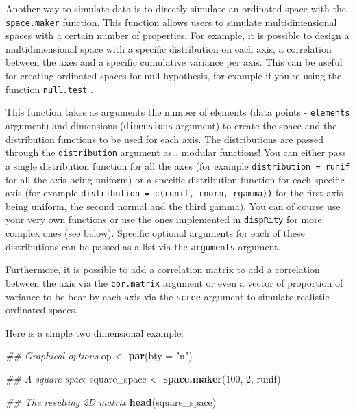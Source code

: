 \documentclass[
]{book}
\newenvironment{Shaded}{\begin{snugshade}}{\end{snugshade}}
\newcommand{\CommentTok}[1]{\textcolor[rgb]{0.56,0.35,0.01}{\textit{#1}}}
\newcommand{\DataTypeTok}[1]{\textcolor[rgb]{0.13,0.29,0.53}{#1}}
\newcommand{\DecValTok}[1]{\textcolor[rgb]{0.00,0.00,0.81}{#1}}
\newcommand{\KeywordTok}[1]{\textcolor[rgb]{0.13,0.29,0.53}{\textbf{#1}}}
\newcommand{\NormalTok}[1]{#1}
\newcommand{\StringTok}[1]{\textcolor[rgb]{0.31,0.60,0.02}{#1}}
\begin{document}
Another way to simulate data is to directly simulate an ordinated space with the \texttt{space.maker} function.
This function allows users to simulate multidimensional spaces with a certain number of properties.
For example, it is possible to design a multidimensional space with a specific distribution on each axis, a correlation between the axes and a specific cumulative variance per axis.
This can be useful for creating ordinated spaces for null hypothesis, for example if you're using the function \texttt{null.test} \citep{diaz2016global}.

This function takes as arguments the number of elements (data points - \texttt{elements} argument) and dimensions (\texttt{dimensions} argument) to create the space and the distribution functions to be used for each axis.
The distributions are passed through the \texttt{distribution} argument as\ldots{} modular functions!
You can either pass a single distribution function for all the axes (for example \texttt{distribution\ =\ runif} for all the axis being uniform) or a specific distribution function for each specific axis (for example \texttt{distribution\ =\ c(runif,\ rnorm,\ rgamma))} for the first axis being uniform, the second normal and the third gamma).
You can of course use your very own functions or use the ones implemented in \texttt{dispRity} for more complex ones (see below).
Specific optional arguments for each of these distributions can be passed as a list via the \texttt{arguments} argument.

Furthermore, it is possible to add a correlation matrix to add a correlation between the axis via the \texttt{cor.matrix} argument or even a vector of proportion of variance to be bear by each axis via the \texttt{scree} argument to simulate realistic ordinated spaces.

Here is a simple two dimensional example:

\begin{Shaded}
\begin{Highlighting}[]
\CommentTok{\#\# Graphical options}
\NormalTok{op \textless{}{-}}\StringTok{ }\KeywordTok{par}\NormalTok{(}\DataTypeTok{bty =} \StringTok{"n"}\NormalTok{)}

\CommentTok{\#\# A square space}
\NormalTok{square\_space \textless{}{-}}\StringTok{ }\KeywordTok{space.maker}\NormalTok{(}\DecValTok{100}\NormalTok{, }\DecValTok{2}\NormalTok{, runif)}

\CommentTok{\#\# The resulting 2D matrix}
\KeywordTok{head}\NormalTok{(square\_space)}
\end{Highlighting}
\end{Shaded}
\end{document}
